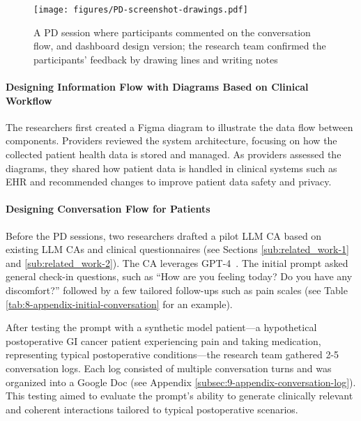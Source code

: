 \begin{figure}[t]
    \centering
    \texttt{[image: figures/PD-screenshot-drawings.pdf]}
    \captionsetup{justification=centerlast}
    \caption{A PD session where participants commented on the conversation flow, and dashboard design version; the research team confirmed the participants' feedback by drawing lines and writing notes %
    }
    \label{fig:participatory-design}
\end{figure}

\paragraph{Designing Information Flow with Diagrams Based on Clinical Workflow}

The researchers first created a Figma diagram to illustrate the data flow between components. Providers reviewed the system architecture, focusing on how the collected patient health data is stored and managed. As providers assessed the diagrams, they shared how patient data is handled in clinical systems such as EHR and recommended changes to improve patient data safety and privacy.


\paragraph{Designing Conversation Flow for Patients}

Before the PD sessions, two researchers drafted a pilot LLM CA based on existing LLM CAs and clinical questionnaires (see Sections \ref{sub:related_work-1} and \ref{sub:related_work-2}). The CA leverages GPT-4~\cite{openai2023gpt4}. The initial prompt asked general check-in questions, such as ``How are you feeling today? Do you have any discomfort?'' followed by a few tailored follow-ups such as pain scales (see Table \ref{tab:8-appendix-initial-conversation} for an example).



After testing the prompt with a synthetic model patient—a hypothetical postoperative GI cancer patient experiencing pain and taking medication, representing typical postoperative conditions—the research team gathered 2-5 conversation logs. Each log consisted of multiple conversation turns and was organized into a Google Doc (see Appendix \ref{subsec:9-appendix-conversation-log}). This testing aimed to evaluate the prompt's ability to generate clinically relevant and coherent interactions tailored to typical postoperative scenarios.

